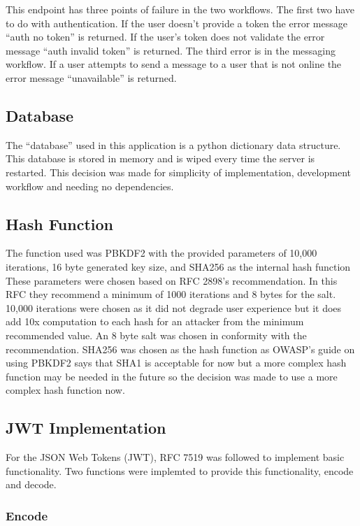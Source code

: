 This endpoint has three points of failure in the two workflows. The first two have to do with authentication. If the user doesn’t provide a token the error message “auth no token” is returned. If the user's token does not validate the error message “auth invalid token” is returned. The third error is in the messaging workflow. If a user attempts to send a message to a user that is not online the error message “unavailable” is returned.


\subsection{Database}


The “database” used in this application is a python dictionary data structure. This database is stored in memory and is wiped every time the server is restarted. This decision was made for simplicity of implementation, development workflow and needing no dependencies. 


\subsection{Hash Function}


The function used was PBKDF2 with the provided parameters of 10,000 iterations, 16 byte generated key size, and SHA256 as the internal hash function \cite{pkcs-rfc}\cite{dsa-rfc} These parameters were chosen based on RFC 2898’s recommendation. In this RFC they recommend a minimum of 1000 iterations and 8 bytes for the salt. 10,000 iterations were chosen as it did not degrade user experience but it does add 10x computation to each hash for an attacker from the minimum recommended value. An 8 byte salt was chosen in conformity with the recommendation. SHA256 was chosen as the hash function as OWASP’s guide on using PBKDF2 says that SHA1 is acceptable for now but a more complex hash function may be needed in the future so the decision was made to use a more complex hash function now. \cite{owasp-pbkdf}


\subsection{JWT Implementation}


For the JSON Web Tokens (JWT), RFC 7519 was followed to implement basic functionality. \cite{jwt-rfc} Two functions were implemted to provide this functionality, encode and decode.


\subsubsection{Encode}


